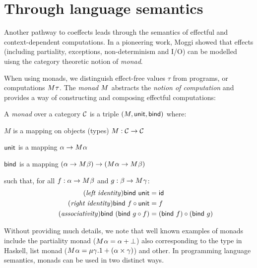 
\section{Through language semantics}
\label{sec:path-sem}

Another pathway to coeffects leads through the semantics of effectful and context-dependent 
computations. In a pioneering work, Moggi \cite{monad-notions} showed that effects (including
partiality, exceptions, non-determinism and I/O) can be modelled uisng the category theoretic
notion of \emph{monad}.

When using monads, we distinguish effect-free values $\tau$ from programs, or 
computations $M^{}\tau$. The \emph{monad} $M^{}$ abstracts the \emph{notion of 
computation} and provides a way of constructing and composing effectful computations:

\begin{definition}
A \emph{monad} over a category $\mathcal{C}$ is a triple $(M, \textnormal{\sffamily unit}, \textnormal{\sffamily bind})$ where:
\begin{compactitem}
\item $M$ is a mapping on objects (types) $M : \mathcal{C} \rightarrow \mathcal{C}$
\item $\textnormal{\sffamily unit}$ is a mapping $\alpha \rightarrow M^{}\alpha$ 
\item $\textnormal{\sffamily bind}$ is a mapping $(\alpha \rightarrow M^{}\beta) 
  \rightarrow (M^{}\alpha \rightarrow M^{}\beta)$
\end{compactitem}
such that, for all $f:\alpha \rightarrow M^{}\beta$ and $g:\beta \rightarrow M^{}\gamma$:
\begin{align}
\tag{\emph{left identity}}
  \ident{bind}~\ident{unit} &= \idf{}
  \\
\tag{\emph{right identity}}
  \ident{bind}~f \circ \ident{unit} &= f
  \\
\tag{\emph{associativity}}
  \ident{bind}~(\ident{bind}~g \circ f) &= (\ident{bind}~f) \circ (\ident{bind}~g)
\end{align}
\end{definition}

\noindent
Without providing much details, we note that well known examples of monads include the partiality
monad ($M^{}\alpha = \alpha + {\bot}$) also corresponding to the  type in 
Haskell, list monad ($M^{}\alpha = \mu \gamma.1 + (\alpha \times \gamma)$) and other.
In programming language semantics, monads can be used in two distinct ways.

